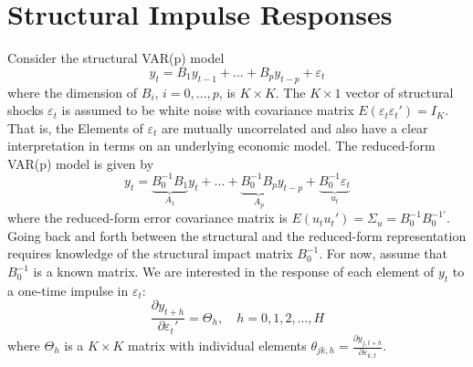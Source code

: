\documentclass[a4paper]{scrartcl}
\begin{document}
    \section{Structural Impulse Responses}
    Consider the structural VAR(p) model $$y_t = B_1 y_{t-1} + ... + B_{p} y_{t-p} + \varepsilon_{t}$$
    where the dimension of $B_i$, $i = 0,...,p$, is $K \times K$. The $K \times 1$ vector of structural shocks $\varepsilon_{t}$ is assumed to be white noise with covariance matrix $E(\varepsilon_t \varepsilon_t') = I_K$. That is, the Elements of $\varepsilon_t$ are mutually uncorrelated and also have a clear interpretation in terms on an underlying economic model. The reduced-form VAR(p) model is given by
    $$y_t = \underbrace{B_0^{-1}B_1}_{A_1}y_t + ... + \underbrace{B_0^{-1}B_p}_{A_p} y_{t-p} + \underbrace{B_0^{-1}\varepsilon_t}_{u_t}$$
    where the reduced-form error covariance matrix is $E(u_t u_t')=\Sigma_u = B_0^{-1}B_0^{-1'}$. Going back and forth between the structural and the reduced-form representation requires knowledge of the structural impact matrix $B_0^{-1}$. For now, assume that $B_0^{-1}$ is a known matrix. We are interested in the response of each element of $y_t$ to a one-time impulse in $\varepsilon_{t}$:
    $$\frac{\partial y_{t+h}}{\partial \varepsilon_{t}'} = \Theta_h, \quad h=0,1,2,...,H$$
    where $\Theta_h$ is a $K\times K$ matrix with individual elements $\theta_{jk,h}=\frac{\partial y_{j,t+h}}{\partial \varepsilon_{k,t}}$.
\end{document}
